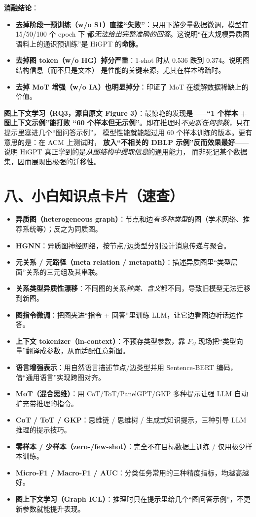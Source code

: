 \documentclass[11pt,UTF8,fontset=fandol]{ctexart}
\begin{document}
\textbf{消融结论}：
\begin{itemize}[leftmargin=2em]
  \item \textbf{去掉阶段一预训练（w/o S1）直接“失败”}：只用下游少量数据微调，模型在 15/50/100 个 epoch 下
        都\emph{无法给出完整准确的回答}。这说明“在大规模异质图语料上的通识预训练”是 HiGPT 的\textbf{命脉}。
  \item \textbf{去掉图 token（w/o HG）掉分严重}：1-shot 时从 0.536 跌到 0.374。说明图结构信息（而不只是文本）
        是性能的关键来源，尤其在样本稀疏时。
  \item \textbf{去掉 MoT 增强（w/o IA）也明显掉分}：印证了 MoT 在缓解数据稀缺上的价值。
\end{itemize}

\textbf{图上下文学习（RQ3，源自原文 Figure 3）}：最惊艳的发现是——\textbf{“1 个样本 + 图上下文示例”能打败
“60 个样本但无示例”}。即在推理时\emph{不更新任何参数}，只在提示里塞进几个“图问答示例”，
模型性能就能超过用 60 个样本训练的版本。更有意思的是：在 ACM 上测试时，
\textbf{放入“不相关的 DBLP 示例”反而效果最好}——说明 HiGPT 真正学到的是\emph{从图结构中提取信息}的通用能力，
而非死记某个数据集，因而展现出极强的迁移性。

\section{八、小白知识点卡片（速查）}
\begin{itemize}[leftmargin=2em]
  \item \textbf{异质图（heterogeneous graph）}：节点和边\emph{有多种类型}的图（学术网络、推荐系统等）；反之为同质图。
  \item \textbf{HGNN}：异质图神经网络，按节点/边类型分别设计消息传递与聚合。
  \item \textbf{元关系 / 元路径（meta relation / metapath）}：描述异质图里“类型层面”关系的三元组及其串联。
  \item \textbf{关系类型异质性漂移}：不同图的关系\emph{种类、含义}都不同，导致旧模型无法迁移到新图。
  \item \textbf{图指令微调}：把图夹进“指令 + 回答”里训练 LLM，让它边看图边听话边作答。
  \item \textbf{上下文 tokenizer（in-context）}：不预存类型参数，靠 $F_{\Omega}$ 现场把“类型向量”翻译成参数，从而适配任意新图。
  \item \textbf{语言增强表示}：用自然语言描述节点/边类型并用 Sentence-BERT 编码，借“通用语言”实现跨图对齐。
  \item \textbf{MoT（混合思维）}：用 CoT/ToT/PanelGPT/GKP 多种提示让强 LLM 自动扩充带推理的指令。
  \item \textbf{CoT / ToT / GKP}：思维链 / 思维树 / 生成式知识提示，三种引导 LLM 推理的提示技巧。
  \item \textbf{零样本 / 少样本（zero-/few-shot）}：完全不在目标数据上训练 / 仅用极少样本训练。
  \item \textbf{Micro-F1 / Macro-F1 / AUC}：分类任务常用的三种精度指标，均越高越好。
  \item \textbf{图上下文学习（Graph ICL）}：推理时只在提示里给几个“图问答示例”，不更新参数就能提升表现。
\end{itemize}
\end{document}
